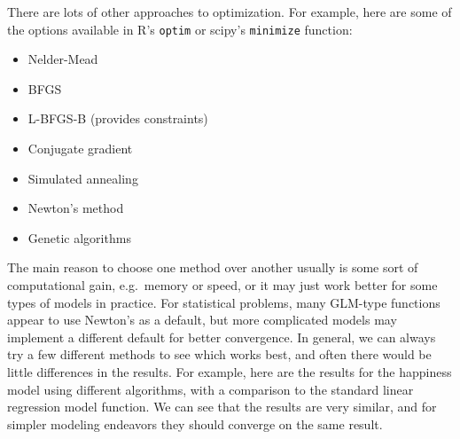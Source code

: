 \documentclass[
  letterpaper,
]{krantz}
\providecommand{\tightlist}{%
  \setlength{\itemsep}{0pt}\setlength{\parskip}{0pt}}\usepackage{longtable,booktabs,array}
\begin{document}
There are lots of other approaches to optimization. For example, here
are some of the options available in R's \texttt{optim} or scipy's
\texttt{minimize} function:

\begin{itemize}
\tightlist
\item
  Nelder-Mead
\item
  BFGS
\item
  L-BFGS-B (provides constraints)
\item
  Conjugate gradient
\item
  Simulated annealing
\item
  Newton's method
\item
  Genetic algorithms
\end{itemize}

The main reason to choose one method over another usually is some sort
of computational gain, e.g.~memory or speed, or it may just work better
for some types of models in practice. For statistical problems, many
GLM-type functions appear to use Newton's as a default, but more
complicated models may implement a different default for better
convergence. In general, we can always try a few different methods to
see which works best, and often there would be little differences in the
results. For example, here are the results for the happiness model using
different algorithms, with a comparison to the standard linear
regression model function. We can see that the results are very similar,
and for simpler modeling endeavors they should converge on the same
result.
\end{document}

